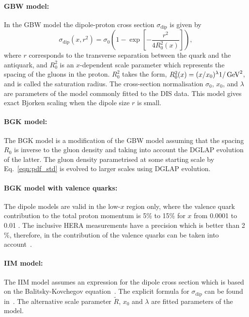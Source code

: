\paragraph{GBW model:} \rm
In the GBW model the dipole-proton cross section $\sigma_{\text{dip}}$ is given by
\begin{equation}
\label{eGBW}
   \sigma_{\text{dip}}(x,r^{2}) = \sigma_{0} \left(1 - \exp \left[-\frac{r^{2}}{4R_{0}^{2}(x)} \right]\right),
\end{equation}
where $r$ corresponds to the transverse separation between the quark and the antiquark, and $R_{0}^{2}$
 is an $x$-dependent scale parameter which represents the spacing of the gluons in the proton. 
$R_{0}^{2}$ takes the form, $R_0^2(x) = (x/x_0)^\lambda  1/ {\rm \,\text{Ge\hspace{-.08em}V}}^{2}$, and is called the saturation radius.
The cross-section normalisation $\sigma_0$, $x_0$, and $\lambda$ are parameters 
of the model commonly fitted to the DIS data.
This model gives exact Bjorken scaling when the dipole size $r$ is small.
 
\paragraph{BGK model:} \rm
The BGK model is a modification of the GBW model assuming that the
spacing $R_0$ is inverse to the gluon density and taking
into account the DGLAP evolution of the latter.
The gluon density parametrised at some starting scale by Eq.~\ref{eqn:pdf_std}
is evolved to larger scales using DGLAP evolution.

\paragraph{BGK model with valence quarks:} \rm
The dipole models are valid in the low-$x$ region only, where the valence quark contribution to the total proton momentum 
is 5\% to 15\% for $x$ from 0.0001 to 0.01 \cite{Collaboration:2010ry}.
The inclusive HERA measurements have a precision which is better than 2$\%$, 
therefore, in \fitter the contribution of the valence quarks can be taken into account~\cite{Luszczak:2013rxa}.

\paragraph{IIM model:} \rm
The IIM model assumes an expression for the dipole cross section which is based on the 
Balitsky-Kovchegov equation~\cite{Balitsky:1995ub}. The explicit formula for $\sigma_{\text{dip}}$ 
can be found in~\cite{Iancu:2003ge}. 
The alternative scale parameter $\tilde{R}$, $x_{0}$ and $\lambda$ are fitted parameters of the model.

